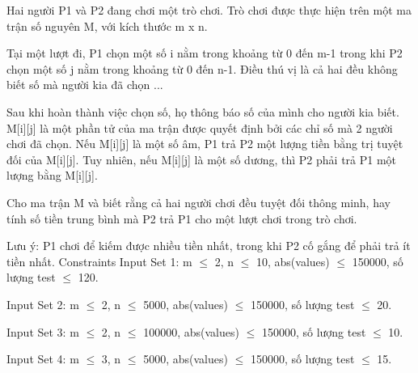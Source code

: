 Hai người P1 và P2 đang chơi một trò chơi. Trò chơi được thực hiện trên một ma trận số nguyên M, với kích thước m x n.  

   Tại một lượt đi, P1 chọn một số i nằm trong khoảng từ 0 đến m-1 trong khi P2 chọn một số j nằm trong khoảng từ 0 đến n-1. Điều thú vị là cả hai đều không biết số mà người kia đã chọn ...  

   Sau khi hoàn thành việc chọn số, họ thông báo số của mình cho người kia biết. M[i][j] là một phần tử của ma trận được quyết định bởi các chỉ số mà 2 người chơi đã chọn. Nếu M[i][j] là một số âm, P1 trả P2 một lượng tiền bằng trị tuyệt đối của M[i][j]. Tuy nhiên, nếu M[i][j] là một số dương, thì P2 phải trả P1 một lượng bằng M[i][j].  

   Cho ma trận M và biết rằng cả hai người chơi đều tuyệt đối thông minh, hay tính số tiền trung bình mà P2 trả P1 cho một lượt chơi trong trò chơi.  

   Lưu ý: P1 chơi để kiếm được nhiều tiền nhất, trong khi P2 cố gắng để phải trả ít tiền nhất.
Constraints
Input Set 1: m  $\le$  2, n  $\le$  10, abs(values)  $\le$  150000, số lượng test  $\le$  120.  

   Input Set 2: m  $\le$  2, n  $\le$  5000, abs(values)  $\le$  150000, số lượng test  $\le$  20.  

   Input Set 3: m  $\le$  2, n  $\le$  100000, abs(values)  $\le$  150000, số lượng test  $\le$  10.  

   Input Set 4: m  $\le$  3, n  $\le$  5000, abs(values)  $\le$  150000, số lượng test  $\le$  15.